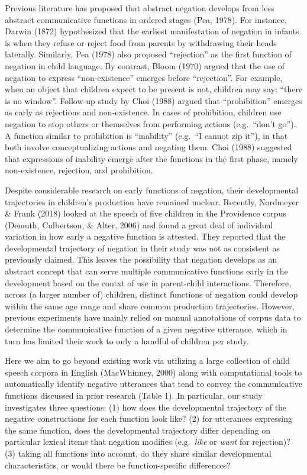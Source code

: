 \documentclass[10pt, letterpaper]{article}
\begin{document}
Previous literature has proposed that abstract negation develops from
less abstract communicative functions in ordered stages (Pea, 1978). For
instance, Darwin (1872) hypothesized that the earliest manifestation of
negation in infants is when they refuse or reject food from parents by
withdrawing their heads laterally. Similarly, Pea (1978) also proposed
``rejection'' as the first function of negation in child language. By
contrast, Bloom (1970) argued that the use of negation to express
``non-existence'' emerges before ``rejection''. For example, when an
object that children expect to be present is not, children may say:
``there is no window''. Follow-up study by Choi (1988) argued that
``prohibition'' emerges as early as rejections and non-existence. In
cases of prohibition, children use negation to stop others or themselves
from performing actions (e.g.~``don't go''). A function similar to
prohibition is ``inability'' (e.g.~``I cannot zip it''), in that both
involve conceptualizing actions and negating them. Choi (1988) suggested
that expressions of inability emerge after the functions in the first
phase, namely non-existence, rejection, and prohibition.

Despite considerable research on early functions of negation, their
developmental trajectories in children's production have remained
unclear. Recently, Nordmeyer \& Frank (2018) looked at the speech of
five children in the Providence corpus (Demuth, Culbertson, \& Alter,
2006) and found a great deal of individual variation in how early a
negative function is attested. They reported that the developmental
trajectory of negation in their study was not as consistent as
previously claimed. This leaves the possibility that negation develops
as an abstract concept that can serve multiple communicative functions
early in the development based on the contxt of use in parent-child
interactions. Therefore, across (a larger number of) children, distinct
functions of negation could develop within the same age range and share
common production trajectories. However, previous experiments have
mainly relied on manual annotations of corpus data to determine the
communicative function of a given negative utterance, which in turn has
limited their work to only a handful of children per study.

Here we aim to go beyond existing work via utilizing a large collection
of child speech corpora in English (MacWhinney, 2000) along with
computational tools to automatically identify negative utterances that
tend to convey the communicative functions discussed in prior research
(Table 1). In particular, our study investigates three questions: (1)
how does the developmental trajectory of the negative constructions for
each function look like? (2) for utterances expressing the same
function, does the developmental trajectory differ depending on
particular lexical items that negation modifies (e.g.~\emph{like} or
\emph{want} for rejection)? (3) taking all functions into account, do
they share similar developmental characteristics, or would there be
function-specific differences?
\end{document}
